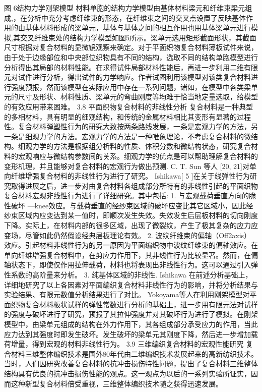图 6结构力学刚架模型
材料单胞的结构力学模型由基体材料梁元和纤维束梁元组成,，在分析中充分考虑纤维束的形态，在纤维束之间的交叉点设置了反映基体作用的由基体材料形成的梁单元，基体与基体之间的相互作用也用基体梁单元进行模拟,其交叉纤维束处的结构力学模型如图5所示。梁单元选用矩形截面形状，其截面尺寸根据对复合材料的显微镜观察来确定。对于平面织物复合材料薄板试件来说，由于处于边缘部位和中央部位织物具有不同的结构，选取不同的结构单胞模型进行分析得出其局部的材料性能。在求得试件局部材料性能后，再进一步利用二维有限元对试件进行分析，得出试件的力学响应。作者试图利用该模型对该类复合材料进行强度预报，然而该模型在实际应用中存在一系列问题，诸如，在模型中各类梁单元的尺寸及形状、材料性质、梁单元的弯曲刚度等均难于恰当地定量选取，给模型的有效应用带来困难。
3.8  平面织物复合材料的非线性分析
复合材料是一种典型的多相材料，具有明显的细观结构，和传统的金属材料相比其变形有显著的过程性。复合材料弹塑性行为的研究大致按两条路线发展，一条是宏观力学的方法，另一条是细观力学的方法。宏观力学的方法是一种唯象理论，不考虑复合材料的微结构。细观力学的方法是根据组分析料的性质、体积分数和微结构状态，研究复合材料的宏观响应与微结构参数间的关系。细观力学的优点是可以帮助理解复合材料的变形机理，并且能够对复合材料的宏观行为做出预测. C. T. Sun 等人 [20, 21]对单向纤维增强复合材料的非线性行为进行了研究。
Ishikawa[ 5 ]在关于线弹性行为研究取得进展之后，进一步对由复合材料各组成部分所特有的非线性引起的平面织物复合材料宏观非线性行为进行了详细研究。其中包括:
1.	与宏观载荷垂直方向的脆性破坏 —knee效应。与载荷垂直的经纱束区域的破坏应变比其它区域小，因此经纱束区域内应变达到某一值时，即顺次发生失效。失效发生后层板材料的切向刚度下降。实际上，在材料内部的很多区域，出现了微裂纹，产生了极其复杂的应力应变场，尽管如此仍然假设经典层板理论有效。
2.	波纹纤维束的偏轴（Off2axis）效应。引起材料非线性行为的另一原因为平面编织物中波纹纤维束的偏轴效应。在单向纤维增强复合材料中，在剪应力作用下，其非线性行为比较显著。然而，在偏轴状态下，即使仅作用拉伸载荷，材料也将表现出非线性行为。这可以通过引入弹性系数的高阶量来分析。
3.	纯基体区域的非线性. Ishikawa 在前述分析基础上，详细地研究了以上各因素对平面编织复合材料非线性行为的影响，并将分析结果与实验结果、有限元数值分析结果进行了对比。
Yokoyama等人在利用刚架模型对平面织物复合材料板状试样的弹性常数进行分析的基础上，进一步用有限元法对试样的强度与破坏进行了研究，预报了其拉伸强度并对其破坏行为进行了模拟。在刚架模型中，由梁单元组成的结构在外力作用下，其各组成部分承受应力的作用，当此应力达到其强度时即发生破坏。发生破坏的梁单元其刚度下降，然后进一步增加载荷增量，得到宏观的材料非线性行为。
3.9  三维编织复合材料的宏观性能研究
复合材料三维整体编织技术是国外80年代由二维编织技术发展起来的高新纺织技术。当时，人们因研究改善复合材料的抗冲击损伤特性问题，提出了复合材料三维整体结构具有优良的抗冲击损伤性能的观点。这一观点为以后的一系列实验所证实，因而这种新型复合材料倍受重视，三维整体编织技术随之获得迅速发展。
